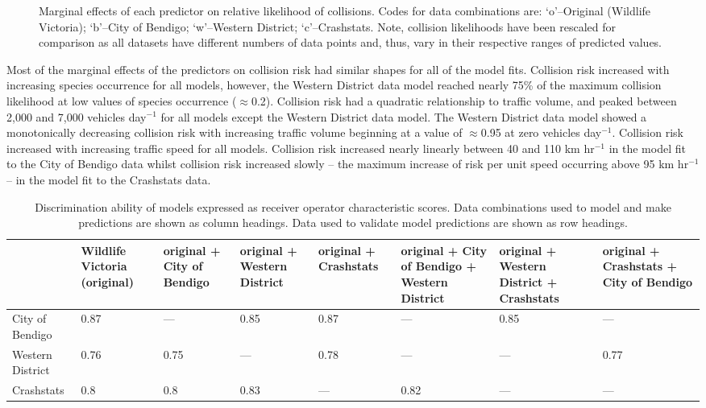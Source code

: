 \begin{figure*}[!t]
  \centering
  \hfill
  \hfill
  \caption[Marginal effects of predictor variables on relative likelihood of collision using independent datasets to train models]{Marginal effects of each predictor on relative likelihood of collisions. Codes for data combinations are: `o'--Original (Wildlife Victoria); `b'--City of Bendigo; `w'--Western District; `c'--Crashstats. Note, collision likelihoods have been rescaled for comparison as all datasets have different numbers of data points and, thus, vary in their respective ranges of predicted values.}
  \label{val_effects}
\end{figure*}

Most of the marginal effects of the predictors on collision risk had similar shapes for all of the model fits. Collision risk increased with increasing species occurrence for all models, however, the Western District data model reached nearly 75\% of the maximum collision likelihood at low values of species occurrence ($\approx$0.2). Collision risk had a quadratic relationship to traffic volume, and peaked between 2,000 and 7,000 vehicles day$^{-1}$ for all models except the Western District data model. The Western District data model showed a monotonically decreasing collision risk with increasing traffic volume beginning at a value of $\approx$0.95 at zero vehicles day$^{-1}$. Collision risk increased with increasing traffic speed for all models. Collision risk increased nearly linearly between 40 and 110 km hr$^{-1}$ in the model fit to the City of Bendigo data whilst collision risk increased slowly -- the maximum increase of risk per unit speed occurring above 95 km hr$^{-1}$ -- in the model fit to the Crashstats data.

\begin{table}[!t]
\caption[Discrimination ability of models using all combinations of independent data]{Discrimination ability of models expressed as receiver operator characteristic scores. Data combinations used to model and make predictions are shown as column headings. Data used to validate model predictions are shown as row headings.}
\centering
\begin{tabularx}{0.9\textwidth}{@{}YYYYYYYY@{}} \toprule
	& Wildlife Victoria
(original) & original + City of Bendigo & original + Western District & original + Crashstats & original + City of Bendigo + Western District & original + Western District + Crashstats & original + Crashstats + City of Bendigo \\ 
  \midrule
City of Bendigo & 0.87 & --- & 0.85 & 0.87 & --- & 0.85 & --- \\ 
Western District & 0.76 & 0.75 & --- & 0.78 & --- & --- & 0.77 \\ 
Crashstats & 0.8 & 0.8 & 0.83 & --- & 0.82 & --- & --- \\
\bottomrule
\end{tabularx}
\label{val_glm_roc}
\end{table}

